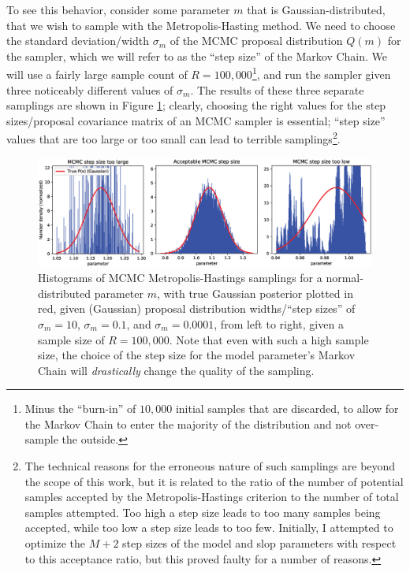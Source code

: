 To see this behavior, consider some parameter $m$ that is Gaussian-distributed, that we wish to sample with the Metropolis-Hasting method. We need to choose the standard deviation/width $\sigma_m$ of the MCMC proposal distribution $Q(m)$ for the sampler, which we will refer to as the ``step size'' of the Markov Chain. We will use a fairly large sample count of $R=100,000$\footnote{Minus the ``burn-in'' of $10,000$ initial samples that are discarded, to allow for the Markov Chain to enter the majority of the distribution and not over-sample the outside.}, and run the sampler given three noticeably different values of $\sigma_m$. The results of these three separate samplings are shown in Figure \ref{fig:mcmcstepsize}; clearly, choosing the right values for the step sizes/proposal covariance matrix of an MCMC sampler is essential; ``step size'' values that are too large or too small can lead to terrible samplings\footnote{The technical reasons for the erroneous nature of such samplings are beyond the scope of this work, but it is related to the  ratio of the number of potential samples accepted by the Metropolis-Hastings criterion to the number of total samples attempted. Too high a step size leads to too many samples being accepted, while too low a step size leads to too few. Initially, I attempted to optimize the $M+2$ step sizes of the model and slop parameters with respect to this acceptance ratio, but this proved faulty for a number of reasons.}.
\begin{figure}
    \centering
    \includegraphics[width=1.0\linewidth]{figures/mcmcstepsizeall.eps}
    \caption{Histograms of MCMC Metropolis-Hastings samplings for a normal-distributed parameter $m$, with true Gaussian posterior plotted in red, given (Gaussian) proposal distribution widths/``step sizes'' of $\sigma_m=10$, $\sigma_m=0.1$, and $\sigma_m=0.0001$, from left to right, given a sample size of $R=100,000$. Note that even with such a high sample size, the choice of the step size for the model parameter's Markov Chain will \textit{drastically} change the quality of the sampling.}
    \label{fig:mcmcstepsize}
\end{figure}
